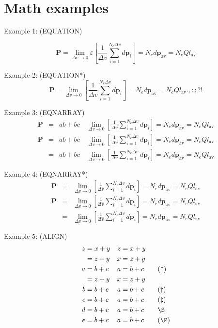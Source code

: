 \documentclass{book}
\begin{document}
\section*{Math examples}

\noindent Example 1: (EQUATION)

\begin{equation}
	\mathbf{P} = \lim_{\Delta v\to 0} \varepsilon
	\left[\frac{1}{\Delta
			v}\sum_{i=1}^{N_{e}\Delta v}d\mathbf{p}_{i}\right] =
	N_{e}d\mathbf{p}_{\mathrm{av}} = N_{e}Q{l}_{\mathrm{av}} \label{eqn1}
\end{equation}

\noindent Example 2: (EQUATION*)
\begin{equation*}
	\mathbf{P} = \lim_{\Delta v\to 0} \left[\frac{1}{\Delta v}\sum_{i=1}^{N_{e}\Delta v}d\mathbf{p}_{i}\right] = N_{e}d\mathbf{p}_{\mathrm{av}} = N_{e}Q{l}_{\mathrm{av}}.,:;?!
\end{equation*}

\noindent Example 3: (EQNARRAY)
\begin{eqnarray}
	\mathbf{P} &= &ab + bc \quad \lim_{\Delta v\to 0} \left[\frac{1}{\Delta v}\sum_{i=1}^{N_{e}\Delta v}d\mathbf{p}_{i}\right] = N_{e}d\mathbf{p}_{\mathrm{av}} = N_{e}Q{l}_{\mathrm{av}} \nonumber \\
	\mathbf{P} &= &ab + bc \quad \lim_{\Delta v\to 0} \left[\frac{1}{\Delta v}\sum_{i=1}^{N_{e}\Delta v}d\mathbf{p}_{i}\right] = N_{e}d\mathbf{p}_{\mathrm{av}} = N_{e}Q{l}_{\mathrm{av}} \\
	&= &ab + bc \quad \lim_{\Delta v\to 0} \left[\frac{1}{\Delta v}\sum_{i=1}^{N_{e}\Delta v}d\mathbf{p}_{i}\right] = N_{e}d\mathbf{p}_{\mathrm{av}} = N_{e}Q{l}_{\mathrm{av}}
\end{eqnarray}

\noindent Example 4: (EQNARRAY*)
\begin{eqnarray*}
	\mathbf{P} &= &\lim_{\Delta v\to 0} \left[\frac{1}{\Delta v}\sum_{i=1}^{N_{e}\Delta v}d\mathbf{p}_{i}\right] = N_{e}d\mathbf{p}_{\mathrm{av}} = N_{e}Q{l}_{\mathrm{av}} \\
	\mathbf{P} &= &\lim_{\Delta v\to 0} \left[\frac{1}{\Delta v}\sum_{i=1}^{N_{e}\Delta v}d\mathbf{p}_{i}\right] = N_{e}d\mathbf{p}_{\mathrm{av}} = N_{e}Q{l}_{\mathrm{av}} \\
	&= &\lim_{\Delta v\to 0} \left[\frac{1}{\Delta v}\sum_{i=1}^{N_{e}\Delta v}d\mathbf{p}_{i}\right] = N_{e}d\mathbf{p}_{\mathrm{av}} = N_{e}Q{l}_{\mathrm{av}}
\end{eqnarray*}

\noindent Example 5: (ALIGN)
\begin{align}
	z & = x+y & z & = x+y             \\
	  & = z+y & x & = z+y \nonumber   \\
	a & = b+c & a & = b+c \tag{*}     \\
	  & = z+y & x & = z+y \notag      \\
	b & = b+c & a & = b+c \tag{\dag}  \\
	c & = b+c & a & = b+c \tag{\ddag} \\
	d & = b+c & a & = b+c \tag*{\S}   \\
	e & = b+c & a & = b+c \tag{\P}
\end{align}
\end{document}
